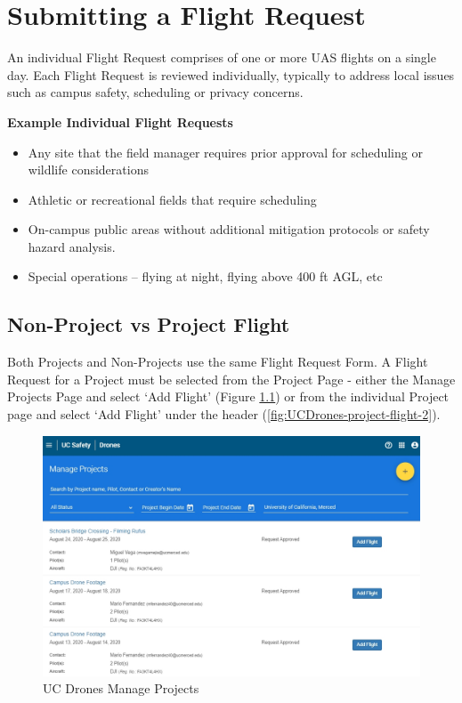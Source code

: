 \documentclass[
]{book}
\providecommand{\tightlist}{%
  \setlength{\itemsep}{0pt}\setlength{\parskip}{0pt}}
\begin{document}
\hypertarget{submitting-a-flight-request}{%
\chapter{Submitting a Flight Request}\label{submitting-a-flight-request}}

An individual Flight Request comprises of one or more UAS flights on a single day. Each Flight Request is reviewed individually, typically to address local issues such as campus safety, scheduling or privacy concerns.

\textbf{Example Individual Flight Requests}

\begin{itemize}
\tightlist
\item
  Any site that the field manager requires prior approval for scheduling or wildlife considerations
\item
  Athletic or recreational fields that require scheduling
\item
  On-campus public areas without additional mitigation protocols or safety hazard analysis.
\item
  Special operations -- flying at night, flying above 400 ft AGL, etc
\end{itemize}

\hypertarget{non-project-vs-project-flight}{%
\section{Non-Project vs Project Flight}\label{non-project-vs-project-flight}}

Both Projects and Non-Projects use the same Flight Request Form. A Flight Request for a Project must be selected from the Project Page - either the Manage Projects Page and select `Add Flight' (Figure \ref{fig:UCDrones-project-flight-1}) or from the individual Project page and select `Add Flight' under the header (\ref{fig:UCDrones-project-flight-2}).

\begin{figure}

{\centering \includegraphics[width=0.85\linewidth]{images/UCDrones_manage_project} 

}

\caption{UC Drones Manage Projects}\label{fig:UCDrones-project-flight-1}
\end{figure}
\end{document}

